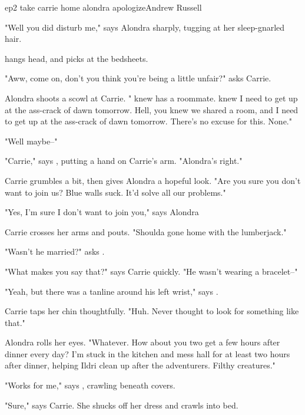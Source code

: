 \documentclass{book}
\begin{document}
\begin{childnode}{ep2 take carrie home alondra apologize}{Andrew Russell}


    "Well you did disturb me," says Alondra sharply, tugging at her sleep-gnarled hair.

    \name{} hangs \hisher{} head, and picks at the bedsheets.

    "Aww, come on, don't you think you're being a little unfair?" asks Carrie. 

    Alondra shoots a scowl at Carrie. "\HeShe{} knew \heshe{} has a roommate. \HeShe{} knew I need to get up at the ass-crack of dawn tomorrow. Hell, you knew we shared a room, and I need to get up at the ass-crack of dawn tomorrow. There's no excuse for 
    this. None."

    "Well maybe--"

    "Carrie," says \name{}, putting a hand on Carrie's arm. "Alondra's right."

    Carrie grumbles a bit, then gives Alondra a hopeful look. "Are you sure you don't want to join us? Blue walls suck. It'd solve all our problems."

    "Yes, I'm sure I don't want to join you," says Alondra 

    Carrie crosses her arms and pouts. "Shoulda gone home with the lumberjack."

    "Wasn't he married?" asks \name{}.

    "What makes you say that?" says Carrie quickly. "He wasn't wearing a bracelet--"

    "Yeah, but there was a tanline around his left wrist," says \name{}. 

    Carrie taps her chin thoughtfully. "Huh. Never thought to look for something like that."

    Alondra rolls her eyes. "Whatever. How about you two get a few hours after dinner every day? I'm stuck in the kitchen and mess hall for at least two hours after dinner, helping Ildri clean up 
    after the adventurers. Filthy creatures."

    "Works for me," says \name{}, crawling beneath \hisher{} covers.

    "Sure," says Carrie. She shucks off her dress and crawls into \names{} bed.


\end{childnode}
\end{document}
